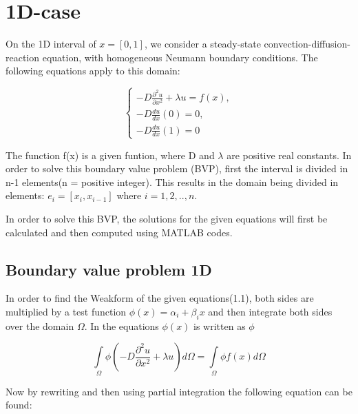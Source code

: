 \documentclass[a4paper]{report}
\begin{document}
\clearpage\mbox{}\clearpage

\tableofcontents


\chapter{1D-case}



On the 1D interval of $x = [0,1]  $, we consider a steady-state convection-diffusion-reaction equation, with homogeneous Neumann boundary conditions. The following equations apply to this domain:

\begin{equation}
\begin{cases} 
-D\frac{\partial^2 u}{\partial x^2} + \lambda u = f(x),\\ -D\frac{du}{dx}(0) = 0 ,\\ -D\frac{du}{dx}(1) = 0
\end{cases} 
\end{equation}
\bigskip

The function f(x) is a given funtion, where D and $\lambda$ are positive real constants. In order to solve this boundary value problem (BVP), first the interval is divided in n-1 elements(n = positive integer). This results in the domain being divided in elements: $e_i = [x_i, x_{i-1}]$ where $i={1,2,..,n}$. 

In order to solve this BVP, the solutions for the given equations will first be calculated and then computed using MATLAB codes.


\section{Boundary value problem 1D}
\vspace{5mm}

In order to find the Weakform of the given equations(1.1), both sides are multiplied by a test function  $\phi(x) = \alpha_i + \beta_i x $ and then integrate both sides over the domain $\Omega$. In the equations  $\phi(x)$ is written as $\phi$


\begin{equation}
	 \int\limits_{\Omega} \phi(-D\frac{\partial^2 u}{\partial x^2} + \lambda u )d\Omega = \int\limits_{\Omega} \phi f(x) d\Omega 
\end{equation}	
\smallskip

Now by rewriting and then using partial integration the following equation can be found:
\end{document}
